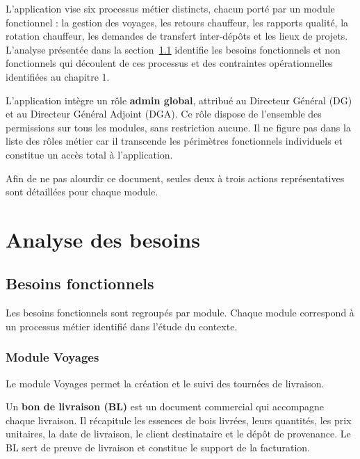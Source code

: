 \documentclass[12pt,a4paper]{article}
\begin{document}
L'application vise six processus métier distincts, chacun porté par un module fonctionnel : la gestion des voyages, les retours chauffeur, les rapports qualité, la rotation chauffeur, les demandes de transfert inter-dépôts et les lieux de projets. L'analyse présentée dans la section~\ref{sec:besoins-fonctionnels} identifie les besoins fonctionnels et non fonctionnels qui découlent de ces processus et des contraintes opérationnelles identifiées au chapitre 1.

L'application intègre un rôle \textbf{admin global}, attribué au Directeur Général (DG) et au Directeur Général Adjoint (DGA). Ce rôle dispose de l'ensemble des permissions sur tous les modules, sans restriction aucune. Il ne figure pas dans la liste des rôles métier car il transcende les périmètres fonctionnels individuels et constitue un accès total à l'application.

Afin de ne pas alourdir ce document, seules deux à trois actions représentatives sont détaillées pour chaque module.

    \section{Analyse des besoins}

    \subsection{Besoins fonctionnels}
    \label{sec:besoins-fonctionnels}
    Les besoins fonctionnels sont regroupés par module. Chaque module correspond à un processus métier identifié dans l'étude du contexte.

    \subsubsection{Module Voyages}
    Le module Voyages permet la création et le suivi des tournées de livraison.

    Un \textbf{bon de livraison (BL)} est un document commercial qui accompagne chaque livraison. Il récapitule les essences de bois livrées, leurs quantités, les prix unitaires, la date de livraison, le client destinataire et le dépôt de provenance. Le BL sert de preuve de livraison et constitue le support de la facturation.
\end{document}
